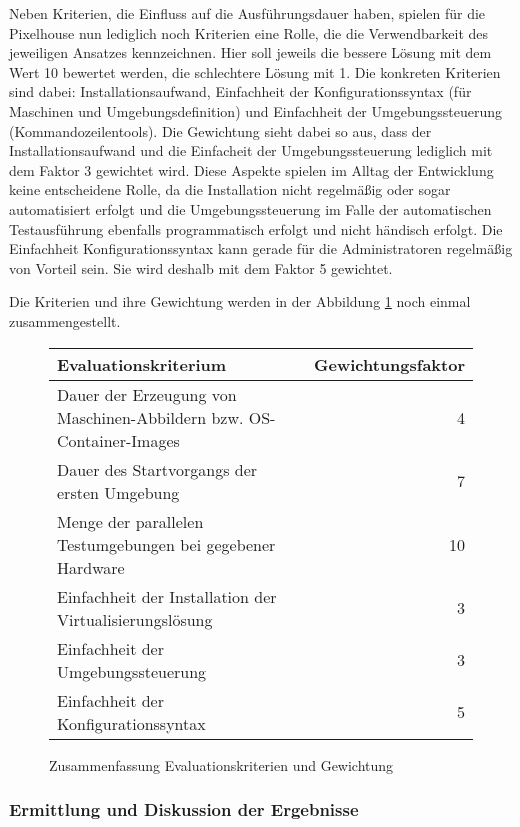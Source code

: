 Neben Kriterien, die Einfluss auf die Ausführungsdauer haben, spielen für die Pixelhouse nun lediglich noch Kriterien eine Rolle, die die Verwendbarkeit des jeweiligen Ansatzes kennzeichnen. Hier soll jeweils die bessere Lösung mit dem Wert 10 bewertet werden, die schlechtere Lösung mit 1. Die konkreten Kriterien sind dabei: Installationsaufwand, Einfachheit der Konfigurationssyntax (für Maschinen und Umgebungsdefinition) und Einfachheit der Umgebungssteuerung (Kommandozeilentools). Die Gewichtung sieht dabei so aus, dass der Installationsaufwand und die Einfacheit der Umgebungssteuerung lediglich mit dem Faktor 3 gewichtet wird. Diese Aspekte spielen im Alltag der Entwicklung keine entscheidene Rolle, da die Installation nicht regelmäßig oder sogar automatisiert erfolgt und die Umgebungssteuerung im Falle der automatischen Testausführung ebenfalls programmatisch erfolgt und nicht händisch erfolgt. Die Einfachheit Konfigurationssyntax kann gerade für die Administratoren regelmäßig von Vorteil sein. Sie wird deshalb mit dem Faktor 5 gewichtet. 

Die Kriterien und ihre Gewichtung werden in der Abbildung \ref{kriterien} noch einmal zusammengestellt.

\begin{figure}[!ht]
  \begin{center}
    \resizebox{15cm}{!} {
      \begin{tabular}{|l|r|}
      \hline
      Evaluationskriterium & Gewichtungsfaktor \\
      \hline
      Dauer der Erzeugung von Maschinen-Abbildern bzw. OS-Container-Images & 4 \\
      \hline
      Dauer des Startvorgangs der ersten Umgebung & 7 \\
      \hline
      Menge der parallelen Testumgebungen bei gegebener Hardware & 10 \\
      \hline
      Einfachheit der Installation der Virtualisierungslösung & 3 \\
      \hline
      Einfachheit der Umgebungssteuerung & 3 \\      
      \hline
      Einfachheit der Konfigurationssyntax & 5 \\
      \hline
      \end{tabular}
    }
    \caption{Zusammenfassung Evaluationskriterien und Gewichtung}
    \label{kriterien}
  \end{center}
\end{figure}

\subsubsection{Ermittlung und Diskussion der Ergebnisse}

